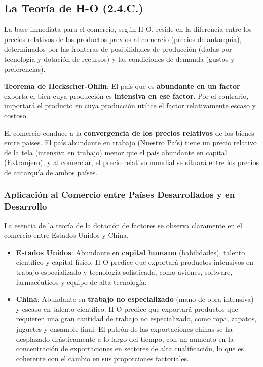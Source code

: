 \subsection{La Teoría de H-O (2.4.C.)}
La base inmediata para el comercio, según H-O, reside en la diferencia entre los precios relativos de los productos previos al comercio (precios de autarquía), determinados por las fronteras de posibilidades de producción (dadas por tecnología y dotación de recursos) y las condiciones de demanda (gustos y preferencias).

\begin{teorema}
\textbf{Teorema de Heckscher-Ohlin}: El país que es \textbf{abundante en un factor} exporta el bien cuya producción es \textbf{intensiva en ese factor}. Por el contrario, importará el producto en cuya producción utilice el factor relativamente escaso y costoso.
\end{teorema}

El comercio conduce a la \textbf{convergencia de los precios relativos} de los bienes entre países. El país abundante en trabajo (Nuestro País) tiene un precio relativo de la tela (intensiva en trabajo) menor que el país abundante en capital (Extranjero), y al comerciar, el precio relativo mundial se situará entre los precios de autarquía de ambos países.

\subsubsection{Aplicación al Comercio entre Países Desarrollados y en Desarrollo}
La esencia de la teoría de la dotación de factores se observa claramente en el comercio entre Estados Unidos y China.
\begin{itemize}
    \item \textbf{Estados Unidos}: Abundante en \textbf{capital humano} (habilidades), talento científico y capital físico. H-O predice que exportará productos intensivos en trabajo especializado y tecnología sofisticada, como aviones, software, farmacéuticos y equipo de alta tecnología.
    \item \textbf{China}: Abundante en \textbf{trabajo no especializado} (mano de obra intensiva) y escaso en talento científico. H-O predice que exportará productos que requieren una gran cantidad de trabajo no especializado, como ropa, zapatos, juguetes y ensamble final. El patrón de las exportaciones chinas se ha desplazado drásticamente a lo largo del tiempo, con un aumento en la concentración de exportaciones en sectores de alta cualificación, lo que es coherente con el cambio en sus proporciones factoriales.
\end{itemize}

